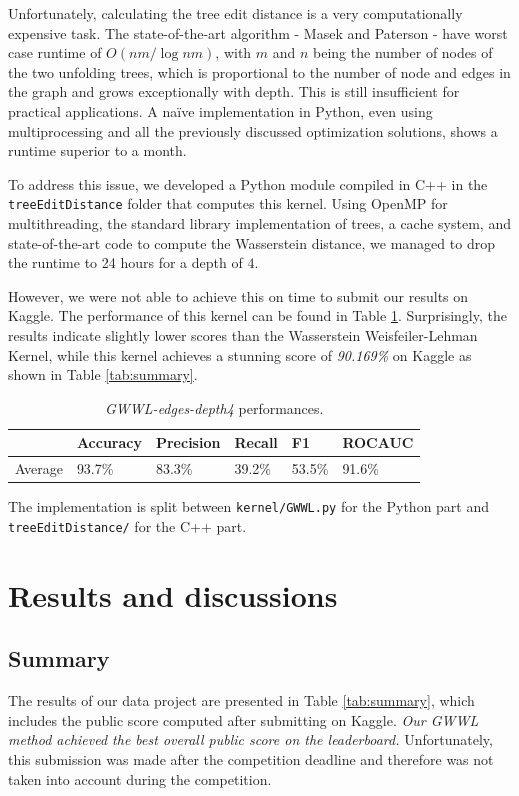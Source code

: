 \documentclass{IEEEtran}
\begin{document}
Unfortunately, calculating the tree edit distance is a very computationally expensive task.
The state-of-the-art algorithm - Masek and Paterson \cite{masek1980faster}- have worst case runtime of $O(nm/ \log nm)$,
with $m$ and $n$ being the number of nodes of the two unfolding trees,
which is proportional to the number of node and edges in the graph and grows exceptionally with depth.
This is still insufficient for practical applications.
A naïve implementation in Python,
even using multiprocessing and all the previously discussed optimization solutions, shows a runtime superior to a month.

To address this issue, we developed a Python module compiled in C++ in the \texttt{treeEditDistance} folder that computes this kernel. Using OpenMP for multithreading, the standard library implementation of trees, a cache system, and state-of-the-art code to compute the Wasserstein distance, we managed to drop the runtime to 24 hours for a depth of $4$.

However, we were not able to achieve this on time to submit our results on Kaggle.
The performance of this kernel can be found in Table \ref{tab:gwwl}.
Surprisingly, the results indicate slightly lower scores than the Wasserstein Weisfeiler-Lehman Kernel,
while this kernel achieves a stunning score of \emph{90.169\%} on Kaggle as shown in Table \ref{tab:summary}.

\begin{table}[h]
    \centering
    \begin{tabular}{l|llll|l}
                & Accuracy & Precision & Recall & F1     & ROCAUC \\
        \hline
        Average & 93.7\%   & 83.3\%    & 39.2\% & 53.5\% & 91.6\% \\
    \end{tabular}
    \caption{\emph{GWWL-edges-depth4} performances.}
    \label{tab:gwwl}
\end{table}

The implementation is split between \texttt{kernel/GWWL.py} for the Python part and \texttt{treeEditDistance/} for the C++ part.

\section{Results and discussions}

\subsection{Summary}
The results of our data project are presented in Table \ref{tab:summary}, which includes the public score computed after submitting on Kaggle.
\emph{Our GWWL method achieved the best overall public score on the leaderboard.}
Unfortunately, this submission was made after the competition deadline
and therefore was not taken into account during the competition.
\end{document}
